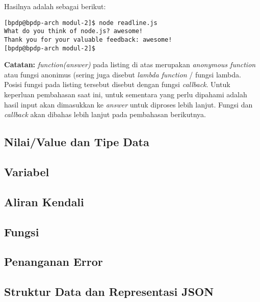 Hasilnya adalah sebagai berikut:

\lstset{language=bash,caption=Hasil eksekusi readline.js}
\begin{lstlisting}
[bpdp@bpdp-arch modul-2]$ node readline.js 
What do you think of node.js? awesome!
Thank you for your valuable feedback: awesome!
[bpdp@bpdp-arch modul-2]$
\end{lstlisting}


\begin{Sbox}
\begin{minipage}{\textwidth}
\textbf{Catatan:} \textit{function(answer)} pada listing di atas merupakan \textit{anonymous function} atau fungsi anonimus (sering juga disebut \textit{lambda function} / fungsi lambda. Posisi fungsi pada listing tersebut disebut dengan fungsi \textit{callback}. Untuk keperluan pembahasan saat ini, untuk sementara yang perlu dipahami adalah hasil input akan dimasukkan ke \textit{answer} untuk diproses lebih lanjut. Fungsi dan \textit{callback} akan dibahas lebih lanjut pada pembahasan berikutnya.
\end{minipage}
\end{Sbox}
\begin{center}
\shadowbox{\TheSbox}
\end{center}

\subsection{Nilai/Value dan Tipe Data}



\subsection{Variabel}


\subsection{Aliran Kendali}

\subsection{Fungsi}

\subsection{Penanganan Error}

\subsection{Struktur Data dan Representasi JSON}

